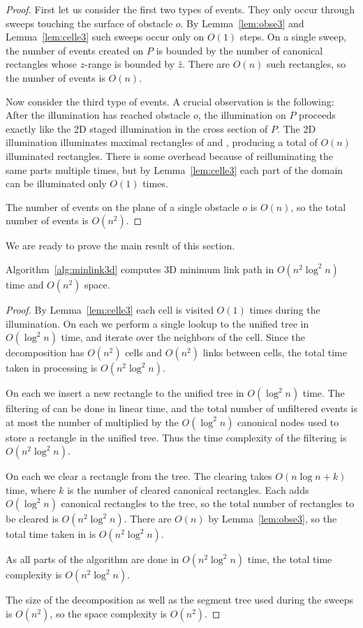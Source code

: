 \documentclass[english,gradu]{tktltiki2018}
\begin{document}
\begin{proof}
First let us consider the first two types of events.
They only occur through sweeps touching the surface of obstacle $o$.
By Lemma~\ref{lem:obse3} and Lemma~\ref{lem:celle3} such sweeps occur only on $O(1)$ steps.
On a single sweep, the number of events created on $P$ is bounded by the number of canonical rectangles whose $z$-range is bounded by $\hat{z}$.
There are $O(n)$ such rectangles, so the number of events is $O(n)$.

Now consider the third type of events.
A crucial observation is the following:
After the illumination has reached obstacle $o$, the illumination on $P$ proceeds exactly like the 2D staged illumination in the cross section of $P$.
The 2D illumination illuminates maximal rectangles of  and , producing a total of $O(n)$ illuminated rectangles.
There is some overhead because of reilluminating the same parts multiple times, but by Lemma~\ref{lem:celle3} each part of the domain can be illuminated only $O(1)$ times.

The number of events on the plane of a single obstacle $o$ is $O(n)$, so the total number of events is $O(n^2)$.
\end{proof}

We are ready to prove the main result of this section.

\begin{theo}Algorithm~\ref{alg:minlink3d} computes 3D minimum link path in $O(n^2\log^2n)$ time and $O(n^2)$ space.\end{theo}
\begin{proof}
By Lemma~\ref{lem:celle3} each cell is visited $O(1)$ times during the illumination.
On each \cellE we perform a single lookup to the unified tree in $O(\log^2 n)$ time, and iterate over the neighbors of the cell.
Since the decomposition has $O(n^2)$ cells and $O(n^2)$ links between cells, the total time taken in processing \cellEs is $O(n^2\log^2 n)$.

On each \addE we insert a new rectangle to the unified tree in $O(\log^2 n)$ time.
The filtering of \addEs can be done in linear time, and the total number of unfiltered events is at most the number of \addEs multiplied by the $O(\log^2 n)$ canonical nodes used to store a rectangle in the unified tree.
Thus the time complexity of the filtering is $O(n^2\log^2 n)$.

On each \obsE we clear a rectangle from the tree.
The clearing takes $O(n\log n + k)$ time, where $k$ is the number of cleared canonical rectangles.
Each \addE adds $O(\log^2 n)$ canonical rectangles to the tree, so the total number of rectangles to be cleared is $O(n^2\log^2 n)$.
There are $O(n)$ \obsEs by Lemma~\ref{lem:obse3}, so the total time taken in \obsEs is $O(n^2\log^2 n)$.

As all parts of the algorithm are done in $O(n^2\log^2 n)$ time, the total time complexity is $O(n^2\log^2 n)$.

The size of the decomposition as well as the segment tree used during the sweeps is $O(n^2)$, so the space complexity is $O(n^2)$.
\end{proof}
\end{document}

